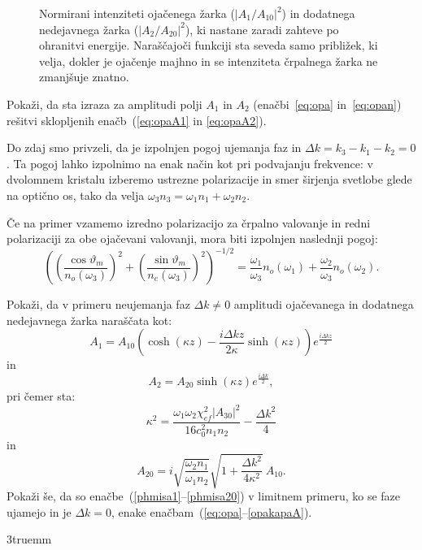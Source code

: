 \begin{figure}[ht]
\centering
\def\svgwidth{90truemm} 

\caption{Normirani intenziteti ojačenega žarka ($|A_1/A_{10}|^2$) in dodatnega 
nedejavnega žarka ($|A_2/A_{20}|^2$), ki nastane zaradi zahteve po ohranitvi energije. 
Naraščajoči funkciji sta seveda samo približek, ki velja, dokler je ojačenje majhno in 
se intenziteta črpalnega žarka ne zmanjšuje znatno.}
\label{fig:opagraf}
\end{figure}

\begin{naloga}
Pokaži, da sta izraza za amplitudi polji $A_1$ in $A_2$ (enačbi~\ref{eq:opa} in~\ref{eq:opan})
rešitvi sklopljenih enačb~(\ref{eq:opaA1} in \ref{eq:opaA2}).
\end{naloga}

Do zdaj smo privzeli, da je izpolnjen pogoj ujemanja faz 
in $\Delta k=k_{3}-k_{1}-k_{2}=0$. 
Ta pogoj lahko izpolnimo na enak način kot pri podvajanju frekvence: v dvolomnem kristalu 
izberemo ustrezne polarizacije in smer širjenja svetlobe glede na optično os, 
tako da velja $\omega_{3}n_{3}=\omega_{1}n_{1}+\omega_{2}n_{2}$.

Če na primer vzamemo izredno polarizacijo za črpalno valovanje
in redni polarizaciji za obe ojačevani valovanji, mora biti izpolnjen naslednji pogoj:
\begin{equation}
\left(\left(\frac{\cos\vartheta_{m}}{n_{o}(\omega_3)}\right)^{2}
+\left(\frac{\sin\vartheta_{m}}{n_{e}(\omega_3)}\right)^{2}\right)^{-1/2}=
\frac{\omega_{1}}{\omega_{3}}n_{o}(\omega_1)+\frac{\omega_{2}}{\omega_{3}}n_{o}(\omega_2).
\label{8.34}
\end{equation}

\begin{naloga}
Pokaži, da v primeru neujemanja faz $\Delta k \neq 0$ amplitudi ojačevanega in dodatnega 
nedejavnega žarka naraščata kot: 
\begin{equation}
A_1 = A_{10} \left( \cosh(\kappa z) - \frac{i \Delta kz}{2 \kappa} \sinh (\kappa z) 
\right) e^{\frac{i \Delta kz}{2}}
\label{phmisa1}
\end{equation}
in
\begin{equation}
A_2 = A_{20} \sinh(\kappa z) e^{\frac{i \Delta k}{2}},
\end{equation}
pri čemer sta:
\begin{equation}
\kappa^2 = \frac{\omega_1 \omega_2 \chi_{ef}^2|A_{30}|^2}
{16 c_0^2 n_1 n_2} - \frac{\Delta k^2}{4}
\end{equation}
in
\begin{equation}
A_{20} = i \sqrt{\frac{\omega_2 n_1}{\omega_1 n_2}} \sqrt{1 + \frac{\Delta k^2}{4 \kappa^2}}
~A_{10}.
\label{phmisa20}
\end{equation}
Pokaži še, da so enačbe~(\ref{phmisa1}--\ref{phmisa20}) v limitnem primeru, 
ko se faze ujamejo in je $\Delta k = 0$,
enake enačbam~(\ref{eq:opa}--\ref{opakapaA}).
\end{naloga}
\vglue3truemm

